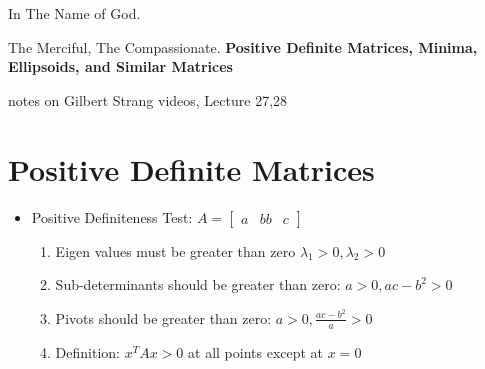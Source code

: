 \documentclass[a4paper,12pt]{article}
\theoremstyle{definition} \newtheorem{Theorem}{Theorem}
\begin{document}
\begin{center}
In The Name of God.

The Merciful, The Compassionate.
\vskip 1cm
{\Large\bfseries{Positive Definite Matrices, Minima, Ellipsoids, and Similar Matrices }}

\vskip 0.2cm
\tiny{notes on Gilbert Strang videos, Lecture 27,28}
\end{center}

\section{Positive Definite Matrices}
\begin{itemize}
\item Positive Definiteness Test: $ A = \begin{bmatrix}
						a & b
						b & c
					 \end{bmatrix}$
\begin{enumerate}
\item Eigen values must be greater than zero $\lambda_1 > 0, \lambda_2 > 0$
\item Sub-determinants should be greater than zero: $a > 0, ac - b^2 > 0$
\item Pivots should be greater than zero: $a>0, \frac{ac-b^2}{a} > 0 $
\item Definition: $x^T A x > 0$ at all points except at $x=0$
\end{enumerate}
\end{itemize}
\end{document}
